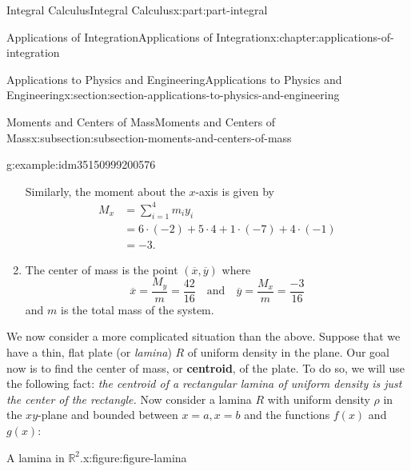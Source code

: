 \documentclass[twoside,10pt,]{book}
\newcommand{\terminology}[1]{\textbf{#1}}
\numberwithin{equation}{part}
\newcommand{\amp}{&}
\begin{document}
\begin{partptx}{Integral Calculus}{}{Integral Calculus}{}{}{x:part:part-integral}
\begin{chapterptx}{Applications of Integration}{}{Applications of Integration}{}{}{x:chapter:applications-of-integration}
\begin{sectionptx}{Applications to Physics and Engineering}{}{Applications to Physics and Engineering}{}{}{x:section:section-applications-to-physics-and-engineering}
\begin{subsectionptx}{Moments and Centers of Mass}{}{Moments and Centers of Mass}{}{}{x:subsection:subsection-moments-and-centers-of-mass}
\begin{example}{}{g:example:idm35150999200576}
\begin{enumerate}
%
\par
Similarly, the moment about the \(x\)-axis is given by%
\begin{align*}
M_{x}\amp= \sum_{i=1}^{4}m_{i}y_{i}\\
\amp= 6\cdot(-2)+5\cdot4+1\cdot(-7)+4\cdot(-1)\\
\amp= -3.
\end{align*}
%
\item{}The center of mass is the point \((\overline{x},\overline{y})\) where%
\begin{equation*}
\overline{x} = \frac{M_{y}}{m} = \frac{42}{16}\quad\text{and}\quad\overline{y}=\frac{M_{x}}{m} = \frac{-3}{16}
\end{equation*}
and \(m\) is the total mass of the system.%
\end{enumerate}
\end{example}
\textbraceright{} We now consider a more complicated situation than the above. Suppose that we have a thin, flat plate (or \emph{lamina}) \(R\) of uniform density in the plane. Our goal now is to find the center of mass, or \terminology{centroid}, of the plate. To do so, we will use the following fact: \emph{the centroid of a rectangular lamina of uniform density is just the center of the rectangle.} Now consider a lamina \(R\) with uniform density \(\rho\) in the \(xy\)-plane and bounded between \(x=a,x=b\) and the functions \(f(x)\) and \(g(x)\):%
\begin{figureptx}{A lamina in \(\mathbb{R}^{2}\).}{x:figure:figure-lamina}{}%
\begin{image}{0}{1}{0}%
\resizebox{\linewidth}{!}{%
\begin{tikzpicture}
\begin{axis}[
axis lines=middle,
xmin=-0.5,
xmax=8,
ymin=-5,
ymax=7,
domain=0.5:7.5,
xtick={0.75,6.25},
xticklabels={$a$,$b$},
ytick={0},
axis on top
]


\end{axis}
\end{tikzpicture}}
\end{image}
\end{figureptx}
\end{subsectionptx}
\end{sectionptx}
\end{chapterptx}
\end{partptx}
\end{document}
